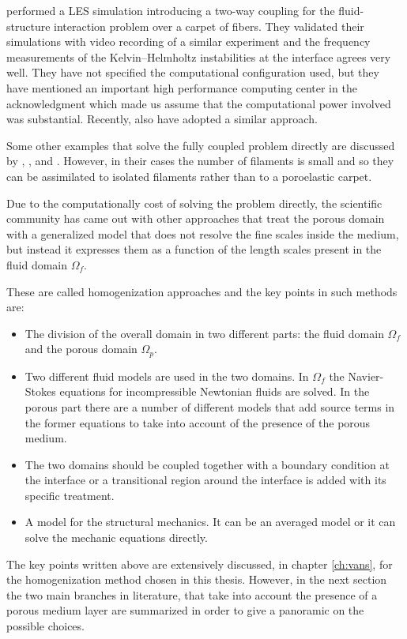 \citet{dupont2010modelling} performed a LES simulation introducing a two-way coupling for the fluid-structure interaction problem over a carpet of fibers. They validated their simulations with video recording of a similar experiment and the frequency measurements of the Kelvin–Helmholtz instabilities at the interface agrees very well.
They have not specified the computational configuration used, but they have mentioned an important high performance computing center in the acknowledgment which made us assume that the computational power involved was substantial.
Recently, also \citet{marjoribanks2017does} have adopted a similar approach.

Some other examples that solve the fully coupled problem directly are discussed by \citet{monti2017large}, \citet{pinelli2017pelskin}, \citet{favier2017pelskin} and \citet{revell2017pelskin}. However, in their cases the number of filaments is small and so they can be assimilated to isolated filaments rather than to a poroelastic carpet.

Due to the computationally cost of solving the problem directly, the scientific community has came out with other approaches that treat the porous domain with a generalized model that does not resolve the fine scales inside the medium, but instead it expresses them as a function of the length scales present in the fluid domain $\Omega_{f}$.

These are called homogenization approaches and the key points in such methods are:
\begin{itemize}
	\item The division of the overall domain in two different parts: the fluid domain $\Omega_{f}$ and the porous domain $\Omega_{p}$.
	\item Two different fluid models are used in the two domains. In $\Omega_{f}$ the Navier-Stokes equations for incompressible Newtonian fluids are solved. In the porous part there are a number of different models that add source terms in the former equations to take into account of the presence of the porous medium.
	\item The two domains should be coupled together with a boundary condition at the interface or a transitional region around the interface is added with its specific treatment.
	\item A model for the structural mechanics. It can be an averaged model or it can solve the mechanic equations directly.
\end{itemize}

The key points written above are extensively discussed, in chapter \ref{ch:vans}, for the homogenization method chosen in this thesis.
However, in the next section the two main branches in literature, that take into account the presence of a porous medium layer are summarized in order to give a panoramic on the possible choices.


